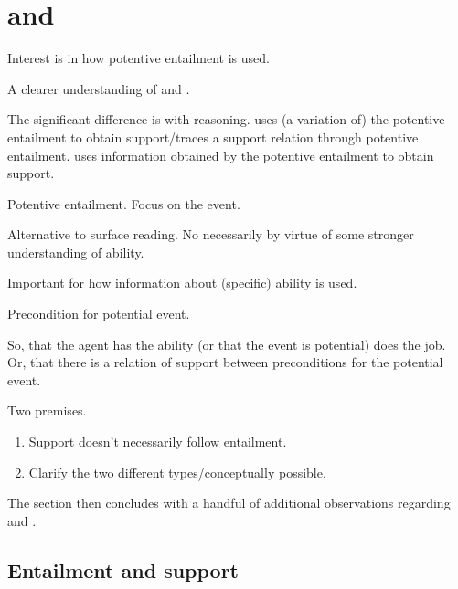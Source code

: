 \section{\AR{} and \WR{}}
\label{sec:ar-wr}

\begin{note}[Overview]
  Interest is in how potentive entailment is used.

  A clearer understanding of \AR{} and \WR{}.

  The significant difference is with reasoning.
  \AR{} uses (a variation of) the potentive entailment to obtain support/traces a support relation through potentive entailment.
  \WR{} uses information obtained by the potentive entailment to obtain support.
\end{note}

\begin{note}[So far]
  Potentive entailment.
  Focus on the event.

  Alternative to surface reading.
  No necessarily by virtue of some stronger understanding of ability.

  Important for how information about (specific) ability is used.

  Precondition for potential event.

  So, that the agent has the ability (or that the event is potential) does the job.
  Or, that there is a relation of support between preconditions for the potential event.
\end{note}

\begin{note}[Structure]
  Two premises.
  \begin{enumerate}
  \item Support doesn't necessarily follow entailment.
  \item Clarify the two different types/conceptually possible.
  \end{enumerate}
  The section then concludes with a handful of additional observations regarding \AR{} and \WR{}.
\end{note}

\subsection{Entailment and support}
\label{sec:entailment-support}

